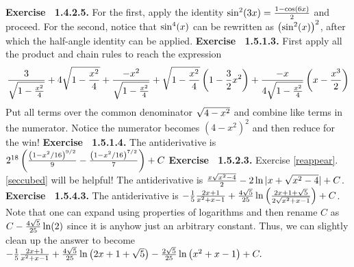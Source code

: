  {\noindent \protect \bf  Exercise ~1.4.2.5.} For the first, apply the identity $\protect \qopname  \relax o{sin}^2(3x)=\protect \frac  {1-\protect \qopname  \relax o{cos}(6x)}{2}$ and proceed. For the second, notice that $\protect \qopname  \relax o{sin}^4(x)$ can be rewritten as $\left (\protect \qopname  \relax o{sin}^2(x)\right )^2$, after which the half-angle identity can be applied. \protect \newline  \protect \newline  
 {\noindent \protect \bf  Exercise ~1.5.1.3.} First apply all the product and chain rules to reach the expression $$\protect \frac  {3}{\protect \sqrt  {1-\protect \frac  {x^2}{4}}}+4\protect \sqrt  {1-\protect \frac  {x^2}{4}}+\protect \frac  {-x^2}{\protect \sqrt  {1-\protect \frac  {x^2}{4}}}+\protect \sqrt  {1-\protect \frac  {x^2}{4}}\left (1-\protect \frac  {3}{2}x^2\right )+\protect \frac  {-x}{4\protect \sqrt  {1-\protect \frac  {x^2}{4}}}\left (x-\protect \frac  {x^3}{2}\right ) $$ Put all terms over the common denominator $\protect \sqrt  {4-x^2}$ and combine like terms in the numerator. Notice the numerator becomes $\left (4-x^2\right )^2$ and then reduce for the win! \protect \newline  \protect \newline  
 {\noindent \protect \bf  Exercise ~1.5.1.4.} The antiderivative is $2^{18}\left (\protect \frac  {\left (1-x^2/16\right )^{9/2}}{9}-\protect \frac  {\left (1-x^2/16\right )^{7/2}}{7}\right )+C$ \protect \newline  \protect \newline  
 {\noindent \protect \bf  Exercise ~1.5.2.3.} Exercise \protect \ref  {reappear}.\protect \ref  {seccubed} will be helpful! The antiderivative is $\protect \frac  {x\protect \sqrt  {x^2-4}}{2}-2\protect \qopname  \relax o{ln}|x+\protect \sqrt  {x^2-4}|+C$. \protect \newline  \protect \newline  
 {\noindent \protect \bf  Exercise ~1.5.4.3.} The antiderivative is $-\protect \frac  {1}{5}\protect \frac  {2x+1}{x^2+x-1}+\protect \frac  {4\protect \sqrt  {5}}{25}\protect \qopname  \relax o{ln}\left (\protect \frac  {2x+1+\protect \sqrt  {5}}{2\protect \sqrt  {x^2+x-1}}\right )+C$. Note that one can expand using properties of logarithms and then rename $C$ as $C-\protect \frac  {4\protect \sqrt  {5}}{25}\protect \qopname  \relax o{ln}(2)$ since it is anyhow just an arbitrary constant. Thus, we can slightly clean up the answer to become $-\protect \frac  {1}{5}\protect \frac  {2x+1}{x^2+x-1}+\protect \frac  {4\protect \sqrt  {5}}{25}\protect \qopname  \relax o{ln}\left (2x+1+\protect \sqrt  {5}\right )-\protect \frac  {2\protect \sqrt  {5}}{25}\protect \qopname  \relax o{ln}\left (x^2+x-1\right )+C.$ \protect \newline  \protect \newline  

